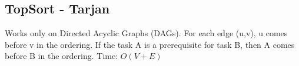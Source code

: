 \subsection{TopSort - Tarjan}

Works only on Directed Acyclic Graphs (DAGs). For each edge (u,v), u comes before v in the ordering.
If the task A is a prerequisite for task B, then A comes before B in the ordering.
Time: $O(V + E)$